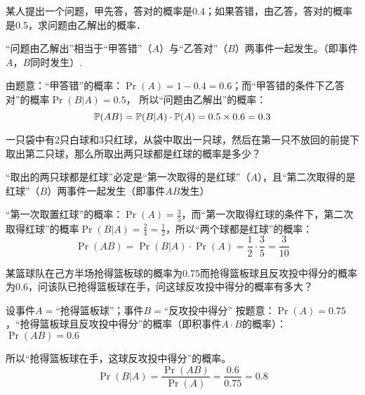\begin{example}
    某人提出一个问题，甲先答，答对的概率是0.4；如果答错，由乙答，答对的概率是0.5，求问题由乙解出的概率．
\end{example}

\begin{solution}
“问题由乙解出”相当于“甲答错”（$A$）与“乙答对”（$B$）两事件一起发生。（即事件$A$，$B$同时发生）.

由题意：“甲答错”的概率：$\Pr(A)=1-0.4=0.6$；而“甲答错的条件下乙答对”的概率$\Pr(B|A)=0.5$，
所以“问题由乙解出”的概率：
\[\mathbb{P}(AB)=\mathbb{P}(B|A)\cdot \mathbb{P}(A)=0.5\times0.6=0.3\]
\end{solution}

\begin{example}
    一只袋中有2只白球和3只红球，从袋中取出一只球，然后在第一只不放回的前提下取出第二只球，那么所取出两只球都是红球的概率是多少？
\end{example}

\begin{solution}
    “取出的两只球都是红球”必定是“第一次取得的是红球”（$A$），且“第二次取得的是红球”（$B$）两事件一起发生（即事件$AB$发生）

    “第一次取置红球”的概率：$\Pr(A)=\frac{3}{5}$，而“第一次取得红球的条件下，第二次取得红球”的概率$\Pr(B|A)=\frac{2}{4}=\frac{1}{2}$，所以“两个球都是红球”的概率：
\[\Pr(AB)=\Pr(B|A)\cdot \Pr(A)=\frac{1}{2}\cdot \frac{3}{5}=\frac{3}{10}\]
\end{solution}

\begin{example}
    某篮球队在己方半场抢得篮板球的概率为0.75而抢得篮板球且反攻投中得分的概率为0.6，问该队已抢得篮板球在手，问这球反攻投中得分的概率有多大？
\end{example}

\begin{solution}
    设事件$A=$“抢得篮板球”；事件$B=$“反攻投中得分”
按题意：$\Pr(A)=0.75$，“抢得篮板球且反攻投中得分”的概率（即积事件$A\cdot B$的概率）：$\Pr(AB)=0.6$

所以“抢得篮板球在手，这球反攻投中得分”的概率。
\[\Pr(B|A)=\frac{\Pr(AB)}{\Pr(A)}=\frac{0.6}{0.75}=0.8\]
\end{solution}

